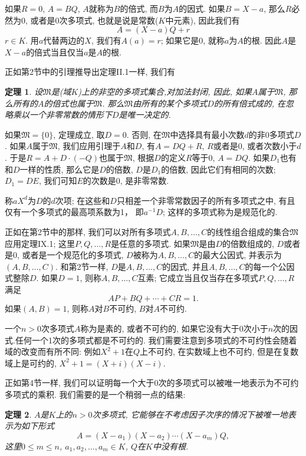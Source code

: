\documentclass[12pt,a4paper]{book} %
\newtheorem{theorem}{定理}
\theoremstyle{remark}
\theoremstyle{example}
\theoremstyle{lemma}
\theoremstyle{corollary}
\numberwithin{theorem}{chapter}
\begin{document}
如果$R = 0$, $A = BQ$, $A$就称为$B$的倍式, 而$B$为$A$的因式. 如果$B = X - a$, 那么$R$必然为0, 或者是0次多项式, 也就是说是常数($K$中元素), 因此我们有
\[
A = (X - a)Q + r
\]
$r \in K$. 用$a$代替两边的$X$, 我们有$A(a) = r$; 如果它是0, 就称$a$为$A$的根. 因此$A$是$X - a$的倍式当且仅当$a$是$A$的根.

正如第2节中的引理推导出定理II.1一样, 我们有
\begin{theorem}
设$\mathfrak{M}$是(域$K$)上的非空的多项式集合,对加法封闭, 因此, 如果$A$属于$\mathfrak{M}$, 那么所有的$A$的倍式也属于$\mathfrak{M}$. 那么$\mathfrak{M}$由所有的某个多项式$D$的所有倍式成的, 在忽略乘以一个非零常数的情形下$D$是唯一决定的.
\end{theorem}

如果$\mathfrak{M} = \{0\}$, 定理成立, 取$D = 0$. 否则, 在$\mathfrak{M}$中选择具有最小次数$d$的非0多项式$D$. 如果$A$属于$\mathfrak{M}$, 我们应用引理于$A$和$D$, 有$A = DQ + R$, $R$或者是0, 或者次数小于$d$. 于是$R = A + D \cdot (-Q)$也属于$\mathfrak{M}$, 根据$D$的定义$R$等于0, $A = DQ$. 如果$D_1$也有和$D$一样的性质, 那么它是$D$的倍数, $D$是$D_1$的倍数, 因此它们有相同的次数; $D_1 = DE$, 我们可知$E$的次数是0, 是非零常数.

称$aX^d$为$D$的$d$次项; 在这些和$D$只相差一个非零常数因子的所有多项式之中, 有且仅有一个多项式的最高项系数为1， 即$a^{-1}D$; 这样的多项式称为是规范化的.

正如在第2节中的那样, 我们可以对所有多项式$A, B, \ldots, C$的线性组合组成的集合$\mathfrak{M}$应用定理IX.1; 这里$P, Q, \ldots, R$是任意的多项式.  如果$\mathfrak{M}$是由$D$的倍数组成的, $D$或者是0, 或者是一个规范化的多项式, $D$被称为$A, B, \ldots, C$的最大公因式, 并表示为$(A, B, \ldots, C)$. 和第2节一样, $D$是$A, B, \ldots, C$的因式, 并且$A, B, \ldots, C$的每一个公因式整除$D$. 如果$D = 1$, 则称$A, B, \ldots, C$互素; 它成立当且仅当存在多项式$P, Q, \ldots, R$满足
\[
AP + BQ + \cdots + CR = 1.
\]
如果$(A, B) = 1$, 则称$A$对$B$不可约, $B$对$A$不可约.

一个$n > 0$次多项式$A$称为是素的, 或者不可约的, 如果它没有大于0次小于$n$次的因式.任何一个1次的多项式都是不可约的. 我们需要注意到多项式的不可约性会随着域的改变而有所不同: 例如$X^2 + 1$在$Q$上不可约, 在实数域上也不可约, 但是在复数域上是可约的, $X^2 + 1 = (X + i)(X - i)$.

正如第4节一样, 我们可以证明每一个大于0次的多项式可以被唯一地表示为不可约多项式的乘积. 我们需要的是一个稍弱一点的结果:

\begin{theorem}
$A$是$K$上的$n > 0$次多项式, 它能够在不考虑因子次序的情况下被唯一地表示为如下形式
\[
A = (X - a_1)(X - a_2) \cdots (X - a_m)Q,
\]
这里$0 \le m \le n$, $a_1, a_2, \ldots, a_m \in K$, $Q$在$K$中没有根.
\end{theorem}
\end{document}
